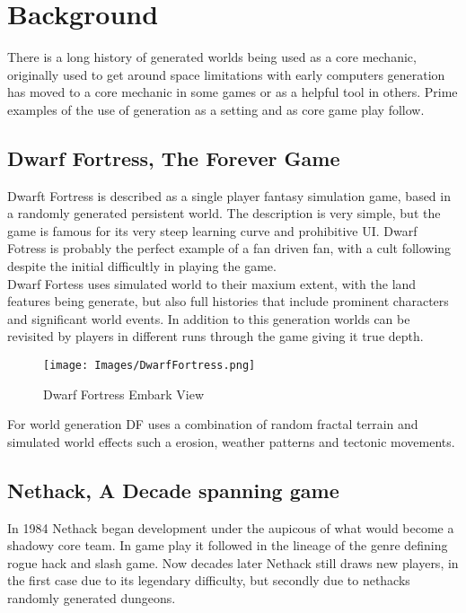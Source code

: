 \section{Background}
There is a long history of generated worlds being used as a core mechanic, 
originally used to get around space limitations with early computers generation
has moved to a core mechanic in some games or as a helpful tool in others. Prime
examples of the use of generation as a setting and as core game play follow.\\

\subsection*{Dwarf Fortress, The Forever Game}
Dwarft Fortress \cite{DwarfFortress} is described as a single player 
fantasy simulation game,
based in a 
randomly generated persistent world. The description is very simple, but the game is
famous for its very steep learning curve and prohibitive UI. Dwarf Fotress is 
probably the perfect example of a fan driven fan, with a cult following despite the
initial difficultly in playing the game.\\

Dwarf Fortess uses simulated world to their maxium extent, with the land features 
being generate, but also full histories that include prominent characters and 
significant world events. In addition to this generation worlds can be revisited by
players in different runs through the game giving it true depth.\\

\begin{figure}[h!]
  \texttt{[image: Images/DwarfFortress.png]}
  \caption{Dwarf Fortress Embark View}
\end{figure}

For world generation DF uses a combination of random fractal terrain and simulated
world effects such a erosion, weather patterns and tectonic movements.\\

\subsection*{Nethack, A Decade spanning game}
In 1984 Nethack \cite{Nethack} began development under the aupicous of what would 
become a 
shadowy core team. In game play it followed in the lineage of the genre defining
rogue hack and slash game. Now decades later Nethack still draws new players,
in the first case due to its legendary difficulty, but secondly due to nethacks 
randomly generated dungeons.\\ 

